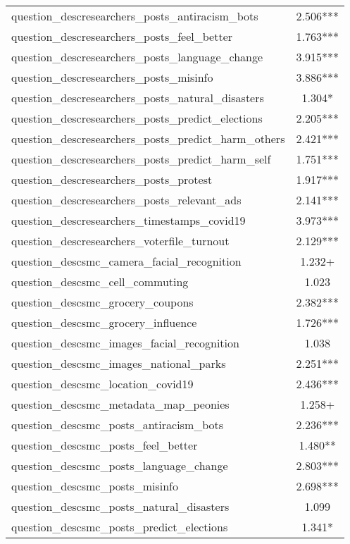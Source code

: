 \begin{table}
\begin{tabular}[t]{lc}
question\_descresearchers\_posts\_antiracism\_bots & \num{2.506}***\\
question\_descresearchers\_posts\_feel\_better & \num{1.763}***\\
question\_descresearchers\_posts\_language\_change & \num{3.915}***\\
question\_descresearchers\_posts\_misinfo & \num{3.886}***\\
question\_descresearchers\_posts\_natural\_disasters & \num{1.304}*\\
question\_descresearchers\_posts\_predict\_elections & \num{2.205}***\\
question\_descresearchers\_posts\_predict\_harm\_others & \num{2.421}***\\
question\_descresearchers\_posts\_predict\_harm\_self & \num{1.751}***\\
question\_descresearchers\_posts\_protest & \num{1.917}***\\
question\_descresearchers\_posts\_relevant\_ads & \num{2.141}***\\
question\_descresearchers\_timestamps\_covid19 & \num{3.973}***\\
question\_descresearchers\_voterfile\_turnout & \num{2.129}***\\
question\_descsmc\_camera\_facial\_recognition & \num{1.232}+\\
question\_descsmc\_cell\_commuting & \num{1.023}\\
question\_descsmc\_grocery\_coupons & \num{2.382}***\\
question\_descsmc\_grocery\_influence & \num{1.726}***\\
question\_descsmc\_images\_facial\_recognition & \num{1.038}\\
question\_descsmc\_images\_national\_parks & \num{2.251}***\\
question\_descsmc\_location\_covid19 & \num{2.436}***\\
question\_descsmc\_metadata\_map\_peonies & \num{1.258}+\\
question\_descsmc\_posts\_antiracism\_bots & \num{2.236}***\\
question\_descsmc\_posts\_feel\_better & \num{1.480}**\\
question\_descsmc\_posts\_language\_change & \num{2.803}***\\
question\_descsmc\_posts\_misinfo & \num{2.698}***\\
question\_descsmc\_posts\_natural\_disasters & \num{1.099}\\
question\_descsmc\_posts\_predict\_elections & \num{1.341}*\\

\end{tabular}
\end{table}
